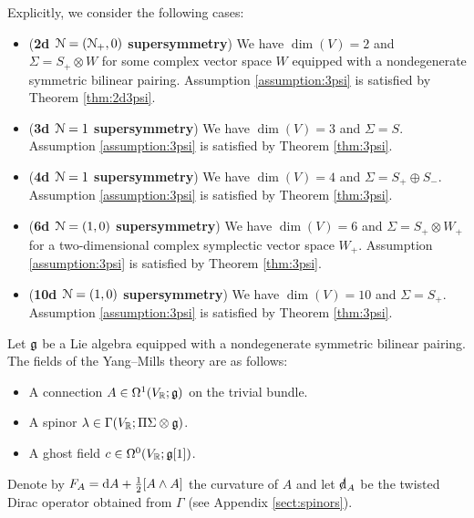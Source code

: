 \documentclass[10pt, oneside]{article}
\begin{document}
Explicitly, we consider the following cases:
\begin{itemize}
\item (\textbf{2d $\mathcal N=(\mathcal N_+, 0)$ supersymmetry}) We have $\dim(V) = 2$ and $\Sigma = S_+\otimes W$ for some complex vector space $W$ equipped with a nondegenerate symmetric bilinear pairing. Assumption \ref{assumption:3psi} is satisfied by Theorem \ref{thm:2d3psi}.

\item (\textbf{3d $\mathcal N=1$ supersymmetry}) We have $\dim(V) = 3$ and $\Sigma = S$. Assumption \ref{assumption:3psi} is satisfied by Theorem \ref{thm:3psi}.

\item (\textbf{4d $\mathcal N=1$ supersymmetry}) We have $\dim(V) = 4$ and $\Sigma = S_+\oplus S_-$. Assumption \ref{assumption:3psi} is satisfied by Theorem \ref{thm:3psi}.

\item (\textbf{6d $\mathcal N=(1, 0)$ supersymmetry}) We have $\dim(V) = 6$ and $\Sigma = S_+\otimes W_+$ for a two-dimensional complex symplectic vector space $W_+$. Assumption \ref{assumption:3psi} is satisfied by Theorem \ref{thm:3psi}.

\item (\textbf{10d $\mathcal N=(1, 0)$ supersymmetry}) We have $\dim(V) = 10$ and $\Sigma = S_+$. Assumption \ref{assumption:3psi} is satisfied by Theorem \ref{thm:3psi}.
\end{itemize}

Let $\mathfrak g$ be a Lie algebra equipped with a nondegenerate symmetric bilinear pairing. The fields of the Yang--Mills theory are as follows:
\begin{itemize}
\item A connection $A \in \Omega^1(V_\mathbb R; \mathfrak g)$ on the trivial bundle.

\item A spinor $\lambda \in \Gamma(V_\mathbb R; \Pi \Sigma \otimes \mathfrak g)$.

\item A ghost field $c\in\Omega^0(V_\mathbb R; \mathfrak g[1])$.
\end{itemize}

Denote by $F_A = {\rm d} A + \frac{1}{2}[A\wedge A]$ the curvature of $A$ and let $\sd\d_A$ be the twisted Dirac operator obtained from $\Gamma$ (see Appendix \ref{sect:spinors}).
\end{document}
